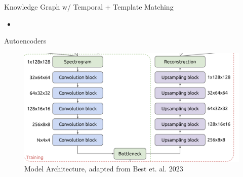 \begin{frame}{Knowledge Graph w/ Temporal + Template Matching}
    \begin{itemize}
        \item 
    \end{itemize}
\end{frame}
\begin{frame}{Autoencoders}
    \centering
    \begin{figure}
        \includegraphics[height=\textheight,width=\textwidth,keepaspectratio]{images/architecture.png}
        \caption{Model Architecture, adapted from Best et. al. 2023}
    \end{figure} 
\end{frame}
            

